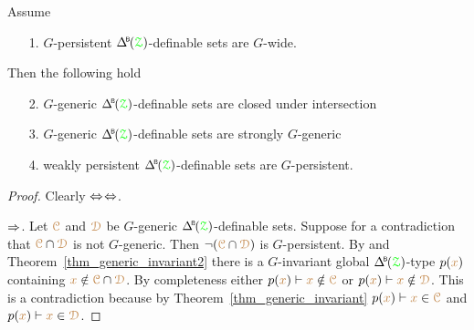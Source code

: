 \begin{theorem}\label{thm_coalesce}
  Assume 
  \begin{itemize}
    \item[1.] $G$-persistent $\BDelta({\grZ})$-definable sets are $G$-wide.
  \end{itemize}
  Then the following hold
  \begin{itemize}
    \item[2.] $G$-generic $\BDelta({\grZ})$-definable sets are closed under intersection 
    \item[3.] $G$-generic $\BDelta({\grZ})$-definable sets are strongly $G$-generic
    \item[4.] weakly persistent $\BDelta({\grZ})$-definable sets are $G$-persistent.
  \end{itemize}
\end{theorem}

\begin{proof}
  Clearly $\Leftrightarrow$$\Leftrightarrow$.

  $\Rightarrow$.
  Let ${\color{brown}\EuScript C}$ and ${\color{brown}\EuScript D}$ be $G$-generic $\BDelta({\grZ})$-definable sets.
  Suppose for a contradiction that ${\color{brown}\EuScript C}\cap{\color{brown}\EuScript D}$ is not $G$-generic.
  Then $\neg({\color{brown}\EuScript C}\cap{\color{brown}\EuScript D})$ is $G$-persistent.
  By  and Theorem~\ref{thm_generic_invariant2} there is a $G$-invariant global $\BDelta({\grZ})$-type $p({\color{brown} x})$ containing ${\color{brown} x}\notin{\color{brown}\EuScript C}\cap{\color{brown}\EuScript D}$.
  By completeness either $p({\color{brown} x})\vdash{\color{brown}x}\notin{\color{brown}\EuScript C}$ or $p({\color{brown} x})\vdash{\color{brown}x}\notin{\color{brown}\EuScript D}$.
  This is a contradiction because by Theorem~\ref{thm_generic_invariant} $p({\color{brown} x})\vdash{\color{brown}x}\in{\color{brown}\EuScript C}$ and $p({\color{brown} x})\vdash{\color{brown}x}\in{\color{brown}\EuScript D}$.
\end{proof}


